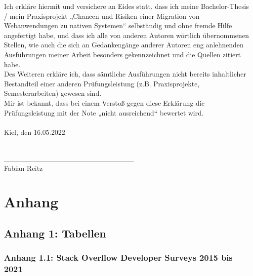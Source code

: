 \documentclass[a4paper]{scrartcl}
\begin{document}
Ich erkläre hiermit und versichere an Eides statt, dass ich meine Bachelor-Thesis / mein Praxisprojekt „Chancen und Risiken einer Migration von Webanwendungen zu nativen Systemen“ selbständig und ohne fremde Hilfe angefertigt habe, und dass ich alle von anderen Autoren wörtlich übernommenen Stellen, wie auch die sich an Gedankengänge anderer Autoren eng anlehnenden Ausführungen meiner Arbeit besonders gekennzeichnet und die Quellen zitiert habe. \\
Des Weiteren erkläre ich, dass sämtliche Ausführungen nicht bereits inhaltlicher Bestandteil einer anderen Prüfungsleistung (z.B. Praxisprojekte, Semesterarbeiten) gewesen sind. \\
Mir ist bekannt, dass bei einem Verstoß gegen diese Erklärung die Prüfungsleistung mit der Note „nicht ausreichend“ bewertet wird. \\ \\

Kiel, den 16.05.2022 \\ \\ 

\begin{tabbing}
	\_\_\_\_\_\_\_\_\_\_\_\_\_\_\_\_\_\_\_\_\_\_\_\_\_ \\
	Fabian Reitz
\end{tabbing}


\newpage

\appendix

\section*{Anhang}

\subsection*{Anhang 1: Tabellen}

\subsubsection*{Anhang 1.1: Stack Overflow Developer Surveys 2015 bis 2021}
\end{document}
